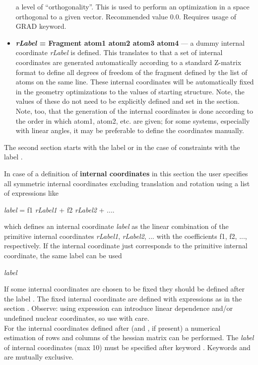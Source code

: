 \begin{itemize}
a level of ``orthogonality''. This is used to perform an optimization in a space
orthogonal to a given vector. Recommended value $0.0$. Requires usage of GRAD keyword.
\item
{\bf {\em rLabel} = Fragment atom1 atom2 atom3 atom4} ---
a dummy internal coordinate {\em rLabel} is defined. This translates to
that a set of internal coordinates are generated automatically according
to a standard Z-matrix format to define all degrees of freedom
of the fragment defined by the list of atoms on the same line. These
internal coordinates will be automatically fixed in the geometry optimizations to
the values of starting structure. Note, the values of these do not need to
be explicitly defined and set in the  section. Note, too, that
the generation of the internal coordinates is done according to the order
in which atom1, atom2, etc. are given; for some systems, especially with
linear angles, it may be preferable to define the coordinates manually.
\end{itemize}


The second section starts with the label  or in the case of constraints
with the label .

In case of a definition of {\bf internal coordinates} in this section the user
specifies all symmetric internal coordinates excluding translation and rotation
using a list of expressions like

         {\em label} = f1 {\em rLabel1} + f2 {\em rLabel2} + ....

which defines an internal coordinate {\em label} as the linear combination of the
primitive internal coordinates {\em rLabel1}, {\em rLabel2}, ... with the coefficients
f1, f2, ..., respectively. If the internal coordinate just corresponds to
the primitive internal coordinate, the same label can be used

         {\em label}

If some internal coordinates are chosen to be fixed they should be defined after
the label . The fixed internal coordinate are defined with
expressions as in the section . Observe: using expression can
introduce linear dependence and/or undefined nuclear coordinates, so use with care.\\
For the internal coordinates defined after  (and , if present)
a numerical estimation of rows and columns of the hessian matrix can be performed. The
{\em label} of internal coordinates (max 10) must be specified after keyword .
Keywords  and  are mutually exclusive.

